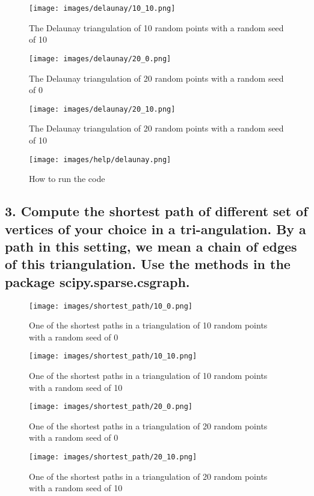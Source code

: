 \documentclass[12pt]{article}
\newenvironment{matlab}
	{\begin{figure}[H]\centering\captionsetup{justification=centering}}
	{\end{figure}}
\begin{document}
\begin{matlab}
    \texttt{[image: images/delaunay/10\_10.png]}
    \caption{The Delaunay triangulation of 10 random points with a random seed of 10}
\end{matlab}

\begin{matlab}
    \texttt{[image: images/delaunay/20\_0.png]}
    \caption{The Delaunay triangulation of 20 random points with a random seed of 0}
\end{matlab}

\begin{matlab}
    \texttt{[image: images/delaunay/20\_10.png]}
    \caption{The Delaunay triangulation of 20 random points with a random seed of 10}
\end{matlab}

\begin{matlab}
    \texttt{[image: images/help/delaunay.png]}
    \caption{How to run the code}
\end{matlab}

\pagebreak

\subsection*{3. Compute the shortest path of different set of vertices of your choice in a tri-angulation. By a path in this setting, we mean a chain of edges of this triangulation. Use the
    methods in the package \textbf{scipy.sparse.csgraph}.}

\begin{matlab}
    \texttt{[image: images/shortest\_path/10\_0.png]}
    \caption{One of the shortest paths in a triangulation of 10 random points with a random seed of 0}
\end{matlab}

\begin{matlab}
    \texttt{[image: images/shortest\_path/10\_10.png]}
    \caption{One of the shortest paths in a triangulation of 10 random points with a random seed of 10}
\end{matlab}

\begin{matlab}
    \texttt{[image: images/shortest\_path/20\_0.png]}
    \caption{One of the shortest paths in a triangulation of 20 random points with a random seed of 0}
\end{matlab}

\begin{matlab}
    \texttt{[image: images/shortest\_path/20\_10.png]}
    \caption{One of the shortest paths in a triangulation of 20 random points with a random seed of 10}
\end{matlab}
\end{document}
